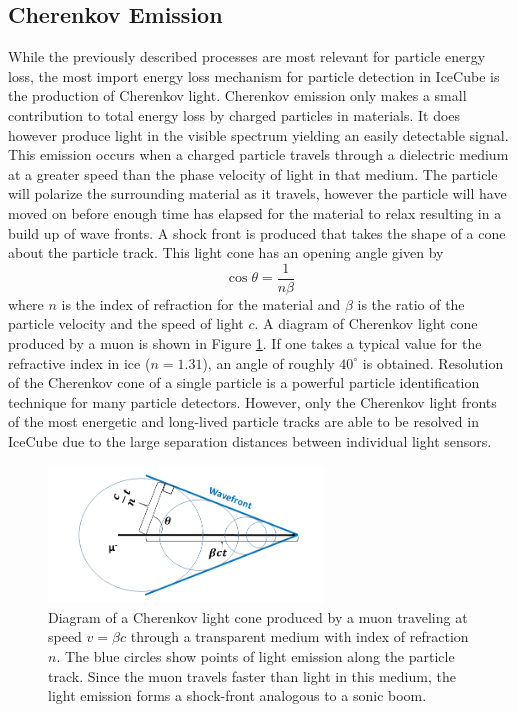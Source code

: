 \documentclass{gatech-thesis}
\begin{document}
\subsection{Cherenkov Emission}
While the previously described processes are most relevant for particle energy loss, the most import energy loss mechanism for particle detection in IceCube is the production of Cherenkov light. Cherenkov emission only makes a small contribution to total energy loss by charged particles in materials. It does however produce light in the visible spectrum yielding an easily detectable signal. This emission occurs when a charged particle travels through a dielectric medium at a greater speed than the phase velocity of light in that medium. The particle will polarize the surrounding material as it travels, however the particle will have moved on before enough time has elapsed for the material to relax resulting in a build up of wave fronts. A shock front is produced that takes the shape of a cone about the particle track. This light cone has an opening angle given by
\begin{equation}
\cos{\theta}=\frac{1}{n\beta}
\end{equation}
where $n$ is the index of refraction for the material and $\beta$ is the ratio of the particle velocity and the speed of light $c$. A diagram of Cherenkov light cone produced by a muon is shown in Figure \ref{fig:CherenkovDiagram}. If one takes a typical value for the refractive index in ice ($n=1.31$), an angle of roughly $40^{\circ}$ is obtained. Resolution of the Cherenkov cone of a single particle is a powerful particle identification technique for many particle detectors. However, only the Cherenkov light fronts of the most energetic and long-lived particle tracks are able to be resolved in IceCube due to the large separation distances between individual light sensors.

\begin{figure}[ht]
  \begin{center}
    \includegraphics[width=0.65\textwidth,keepaspectratio]{CherenkovCartoon.png}
  \end{center}
  \caption[Diagram of Cherenkov Light Cone]{Diagram of a Cherenkov light cone produced by a muon traveling at speed $v=\beta c$ through a transparent medium with index of refraction $n$. The blue circles show points of light emission along the particle track. Since the muon travels faster than light in this medium, the light emission forms a shock-front analogous to a sonic boom.}
  \label{fig:CherenkovDiagram}
\end{figure}
\end{document}
